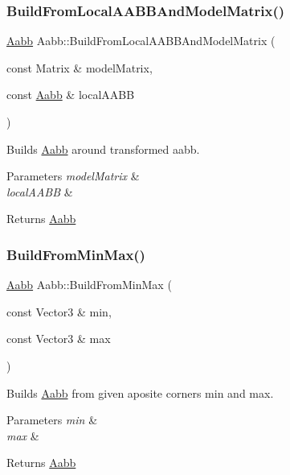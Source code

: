 \subsubsection{\texorpdfstring{Build\+From\+Local\+A\+A\+B\+B\+And\+Model\+Matrix()}{BuildFromLocalAABBAndModelMatrix()}}
{\footnotesize\ttfamily \hyperlink{classAabb}{Aabb} Aabb\+::\+Build\+From\+Local\+A\+A\+B\+B\+And\+Model\+Matrix (\begin{DoxyParamCaption}\item[{const Matrix \&}]{model\+Matrix,  }\item[{const \hyperlink{classAabb}{Aabb} \&}]{local\+A\+A\+BB }\end{DoxyParamCaption})\hspace{0.3cm}{\ttfamily [static]}}



Builds \hyperlink{classAabb}{Aabb} around transformed aabb. 


\begin{DoxyParams}{Parameters}
{\em model\+Matrix} & \\
\hline
{\em local\+A\+A\+BB} & \\
\hline
\end{DoxyParams}
\begin{DoxyReturn}{Returns}
\hyperlink{classAabb}{Aabb} 
\end{DoxyReturn}
\mbox{\label{classAabb_a3b8654c48a3713faebbe7490e261eb6e}} 
\subsubsection{\texorpdfstring{Build\+From\+Min\+Max()}{BuildFromMinMax()}}
{\footnotesize\ttfamily \hyperlink{classAabb}{Aabb} Aabb\+::\+Build\+From\+Min\+Max (\begin{DoxyParamCaption}\item[{const Vector3 \&}]{min,  }\item[{const Vector3 \&}]{max }\end{DoxyParamCaption})\hspace{0.3cm}{\ttfamily [static]}}



Builds \hyperlink{classAabb}{Aabb} from given aposite corners min and max. 


\begin{DoxyParams}{Parameters}
{\em min} & \\
\hline
{\em max} & \\
\hline
\end{DoxyParams}
\begin{DoxyReturn}{Returns}
\hyperlink{classAabb}{Aabb} 
\end{DoxyReturn}
\mbox{\label{classAabb_a7f6f3ebe0340505f04b8bf1fc81c7e5f}} 
